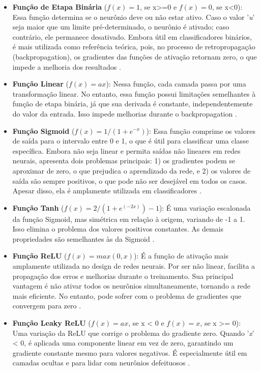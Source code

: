 \begin{itemize}
    \item \textbf{Função de Etapa Binária} ($ f(x) = 1$, se x>=0 e $f(x) = 0$, se x<0): Essa função determina se o neurônio deve ou não estar ativo. Caso o valor '\textit{u}' seja maior que um limite pré-determinado, o neurônio é ativado; caso contrário, ele permanece desativado. Embora útil em classificadores binários, é mais utilizada como referência teórica, pois, no processo de retropropagação (backpropagation), os gradientes das funções de ativação retornam zero, o que impede a melhoria dos resultados \cite{feng2019}.

    \item \textbf{Função Linear} ($ f(x) = ax $): Nessa função, cada camada passa por uma transformação linear. No entanto, essa função possui limitações semelhantes à função de etapa binária, já que sua derivada é constante, independentemente do valor da entrada. Isso impede melhorias durante o backpropagation \cite{feng2019}.

    \item \textbf{Função Sigmoid} ($ f (x) = 1 / (1 + e^{-x}) $): Essa função comprime os valores de saída para o intervalo entre 0 e 1, o que é útil para classificar uma classe específica. Embora não seja linear e permita saídas não lineares em redes neurais, apresenta dois problemas principais: 1) os gradientes podem se aproximar de zero, o que prejudica o aprendizado da rede, e 2) os valores de saída são sempre positivos, o que pode não ser desejável em todos os casos. Apesar disso, ela é amplamente utilizada em classificadores \cite{feng2019}.

    \item \textbf{Função Tanh} ($f (x) = 2 / (1 + e ^{(-2x)}) -1$): É uma variação escalonada da função Sigmoid, mas simétrica em relação à origem, variando de -1 a 1. Isso elimina o problema dos valores positivos constantes. As demais propriedades são semelhantes às da Sigmoid \cite{feng2019}.

    \item \textbf{Função ReLU} ($ f(x) = max(0,x) $): É a função de ativação mais amplamente utilizada no design de redes neurais. Por ser não linear, facilita a propagação dos erros e melhorias durante o treinamento. Sua principal vantagem é não ativar todos os neurônios simultaneamente, tornando a rede mais eficiente. No entanto, pode sofrer com o problema de gradientes que convergem para zero \cite{feng2019}.

    \item \textbf{Função Leaky ReLU} ($f(x) = ax$, se x < 0 e $f(x) = x$, se x >= 0): Uma variação da ReLU que corrige o problema do gradiente zero. Quando '\textit{x}' < 0, é aplicada uma componente linear em vez de zero, garantindo um gradiente constante mesmo para valores negativos. É especialmente útil em camadas ocultas e para lidar com neurônios defeituosos \cite{feng2019}.


\end{itemize}
